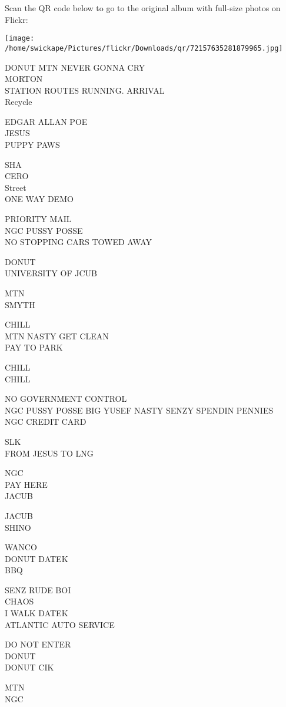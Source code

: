 \documentclass[10pt,letterpaper]{article}
\begin{document}
Scan the QR code below to go to the original album with full-size photos on Flickr:

\texttt{[image: /home/swickape/Pictures/flickr/Downloads/qr/72157635281879965.jpg]}
\pagebreak

DONUT MTN NEVER GONNA CRY\\
MORTON\\
STATION ROUTES RUNNING. ARRIVAL\\
Recycle

EDGAR ALLAN POE\\
JESUS\\
PUPPY PAWS

SHA\\
CERO\\
Street\\
ONE WAY DEMO

PRIORITY MAIL\\
NGC PUSSY POSSE\\
NO STOPPING CARS TOWED AWAY

DONUT\\
UNIVERSITY OF JCUB

MTN\\
SMYTH

CHILL\\
MTN NASTY GET CLEAN\\
PAY TO PARK

CHILL\\
CHILL

NO GOVERNMENT CONTROL\\
NGC PUSSY POSSE BIG YUSEF NASTY SENZY SPENDIN PENNIES\\
NGC CREDIT CARD

SLK\\
FROM JESUS TO LNG

NGC\\
PAY HERE\\
JACUB

JACUB\\
SHINO

WANCO\\
DONUT DATEK\\
BBQ

SENZ RUDE BOI\\
CHAOS\\
I WALK  DATEK\\
ATLANTIC AUTO SERVICE

DO NOT ENTER\\
DONUT\\
DONUT CIK

MTN\\
NGC
\end{document}
